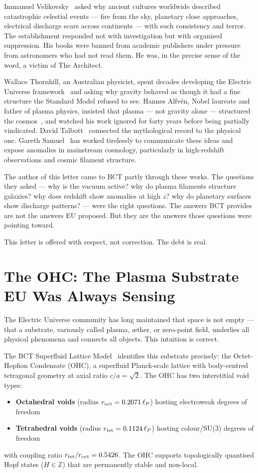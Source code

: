 \documentclass[twocolumn,10pt]{article}
\begin{document}
Immanuel Velikovsky~\cite{velikovsky} asked why ancient cultures worldwide
described catastrophic celestial events --- fire from the sky, planetary
close approaches, electrical discharge scars across continents --- with
such consistency and terror. The establishment responded not with
investigation but with organised suppression. His books were banned from
academic publishers under pressure from astronomers who had not read them.
He was, in the precise sense of the word, a victim of The Architect.

Wallace Thornhill, an Australian physicist, spent decades developing the
Electric Universe framework~\cite{thornhill} and asking why gravity behaved
as though it had a fine structure the Standard Model refused to see.
Hannes Alfv\'{e}n, Nobel laureate and father of plasma physics, insisted
that plasma --- not gravity alone --- structured the cosmos~\cite{alfven},
and watched his work ignored for forty years before being partially
vindicated. David Talbott~\cite{talbott} connected the mythological record
to the physical one. Gareth Samuel~\cite{samuel} has worked tirelessly to
communicate these ideas and expose anomalies in mainstream cosmology,
particularly in high-redshift observations and cosmic filament structure.

The author of this letter came to BCT partly through these works. The
questions they asked --- why is the vacuum active? why do plasma filaments
structure galaxies? why does redshift show anomalies at high $z$? why do
planetary surfaces show discharge patterns? --- were the right questions.
The answers BCT provides are not the answers EU proposed. But they are
the answers those questions were pointing toward.

This letter is offered with respect, not correction. The debt is real.

\section{The OHC: The Plasma Substrate EU Was Always Sensing}

The Electric Universe community has long maintained that space is not
empty --- that a substrate, variously called plasma, æther, or zero-point
field, underlies all physical phenomena and connects all objects. This
intuition is correct.

The BCT Superfluid Lattice Model~\cite{bct_l1} identifies this substrate
precisely: the Octet-Hopfion Condensate (OHC), a superfluid Planck-scale
lattice with body-centred tetragonal geometry at axial ratio
$c/a = \sqrt{2}$. The OHC has two interstitial void types:
\begin{itemize}
\item \textbf{Octahedral voids} (radius $r_{\rm oct} = 0.2071\,\ell_P$)
  hosting electroweak degrees of freedom
\item \textbf{Tetrahedral voids} (radius $r_{\rm tet} = 0.1124\,\ell_P$)
  hosting colour/SU(3) degrees of freedom
\end{itemize}
with coupling ratio $r_{\rm tet}/r_{\rm oct} = 0.5426$. The OHC
supports topologically quantised Hopf states ($H \in \mathbb{Z}$)
that are permanently stable and non-local.
\end{document}
